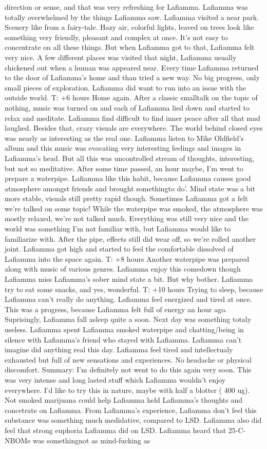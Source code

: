 \documentclass[12pt]{book}
\begin{document}
direction or sense, and that was very refreshing for Lafiamma. Lafiamma was totally overwhelmed by the things Lafiamma saw. Lafiamma visited a near park. Scenery like from a fairy-tale. Hazy air, colorful lights, leaved on trees look like something very friendly, pleasant and complex at once. It's not easy to concentrate on all these things. But when Lafiamma got to that, Lafiamma felt very nice. A few different places was visited that night, Lafiamma usually chickened out when a human was appeared near. Every time Lafiamma returned to the door of Lafiamma's home and than tried a new way. No big progress, only small pieces of exploration. Lafiamma did want to run into an issue with the outside world. T: +6 hours Home again. After a classic smalltalk on the topic of nothing, music was turned on and each of Lafiamma lied down and started to relax and meditate. Lafiamma find difficult to find inner peace after all that mad laughed. Besides that, crazy visuals are everywhere. The world behind closed eyes was nearly as interesting as the real one. Lafiamma listen to Mike Oldfield's album and this music was evocating very interesting feelings and images in Lafiamma's head. But all this was uncontrolled stream of thoughts, interesting, but not so meditative. After some time passed, an hour maybe, I'm went to prepare a waterpipe. Lafiamma like this habit, because Lafiamma causes good atmosphere amongst friends and brought somethingto do'. Mind state was a bit more stable, visuals still pretty rapid though. Sometimes Lafiamma got a felt we're talked on some topic! While the waterpipe was smoked, the atmosphere was mostly relaxed, we're not talked much. Everything was still very nice and the world was something I'm not familiar with, but Lafiamma would like to familiarize with. After the pipe, effects still did wear off, so we're rolled another joint. Lafiamma got high and started to feel the comfortable dissolved of Lafiamma into the space again. T: +8 hours Another waterpipe was prepared along with music of various genres. Lafiamma enjoy this comedown though Lafiamma miss Lafiamma's sober mind state a bit. But why bother. Lafiamma try to eat some snacks, and yes, wonderful. T: +10 hours Trying to sleep, because Lafiamma can't really do anything. Lafiamma feel energized and tired at once. This was a progress, because Lafiamma felt full of energy an hour ago. Suprisingly, Lafiamma fall asleep quite a soon. Next day was something totaly useless. Lafiamma spent Lafiamma smoked waterpipe and chatting/being in silence with Lafiamma's friend who stayed with Lafiamma. Lafiamma can't imagine did anything real this day. Lafiamma feel tired and intellectualy exhausted but full of new sensations and experiences. No headache or physical discomfort. Summary: I'm definitely not went to do this again very soon. This was very intense and long lasted stuff which Lafiamma wouldn't enjoy everywhere. I'd like to try this in nature, maybe with half a blotter ( 400 ug). Not smoked marijuana could help Lafiamma held Lafiamma's thoughts and concetrate on Lafiamma. From Lafiamma's experience, Lafiamma don't feel this substance was something much medidative, compared to LSD. Lafiamma also did feel that strong euphoria Lafiamma did on LSD. Lafiamma heard that 25-C-NBOMe was somethingnot as mind-fucking as 
\end{document}
